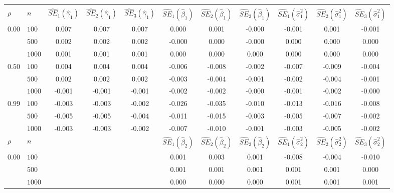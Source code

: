 \begin{landscape}
\begin{table}[ht]
\centering
\begin{tabular}{llccccccccc}
   \thickhline \multicolumn{11}{c}{\textbf{Bias Estimates}}\\ $\rho$ & $n$ & $\widehat{SE}_1(\widehat{\gamma}_1)$ & $\widehat{SE}_2(\widehat{\gamma}_1)$ & $\widehat{SE}_3(\widehat{\gamma}_1)$ & $\widehat{SE}_1(\widehat{\beta}_1)$ & $\widehat{SE}_2(\widehat{\beta}_1)$ & $\widehat{SE}_3(\widehat{\beta}_1)$ & $\widehat{SE}_1(\widehat{\sigma}^2_1)$ & $\widehat{SE}_2(\widehat{\sigma}^2_1)$ & $\widehat{SE}_3(\widehat{\sigma}^2_1)$ \\ 
   \hline$0.00$ & $100$ & 0.007 & 0.007 & 0.007 & 0.000 & 0.001 & -0.000 & -0.001 & 0.001 & -0.001 \\ 
    & $500$ & 0.002 & 0.002 & 0.002 & -0.000 & 0.000 & -0.000 & 0.000 & 0.000 & 0.000 \\ 
    & $1000$ & 0.001 & 0.001 & 0.001 & 0.000 & 0.000 & 0.000 & 0.000 & 0.000 & 0.000 \\ 
  $0.50$ & $100$ & 0.004 & 0.004 & 0.004 & -0.006 & -0.008 & -0.002 & -0.007 & -0.009 & -0.004 \\ 
    & $500$ & 0.002 & 0.002 & 0.002 & -0.003 & -0.004 & -0.001 & -0.002 & -0.004 & -0.001 \\ 
    & $1000$ & -0.001 & -0.001 & -0.001 & -0.002 & -0.002 & -0.000 & -0.001 & -0.002 & -0.000 \\ 
  $0.99$ & $100$ & -0.003 & -0.003 & -0.002 & -0.026 & -0.035 & -0.010 & -0.013 & -0.016 & -0.008 \\ 
    & $500$ & -0.005 & -0.005 & -0.004 & -0.011 & -0.015 & -0.003 & -0.005 & -0.007 & -0.002 \\ 
    & $1000$ & -0.003 & -0.003 & -0.002 & -0.007 & -0.010 & -0.001 & -0.003 & -0.005 & -0.002 \\ 
   \hline$\rho$ & $n$ &   &   &   & $\widehat{SE}_1(\widehat{\beta}_2)$ & $\widehat{SE}_2(\widehat{\beta}_2)$ & $\widehat{SE}_3(\widehat{\beta}_2)$ & $\widehat{SE}_1(\widehat{\sigma}^2_2)$ & $\widehat{SE}_2(\widehat{\sigma}^2_2)$ & $\widehat{SE}_3(\widehat{\sigma}^2_2)$ \\ 
   \hline$0.00$ & $100$ &   &   &   & 0.001 & 0.003 & 0.001 & -0.008 & -0.004 & -0.010 \\ 
    & $500$ &   &   &   & 0.001 & 0.001 & 0.001 & 0.001 & 0.001 & 0.000 \\ 
    & $1000$ &   &   &   & 0.000 & 0.000 & 0.000 & 0.001 & 0.001 & 0.001 \\ 

\end{tabular}
\end{table}
\end{landscape}
